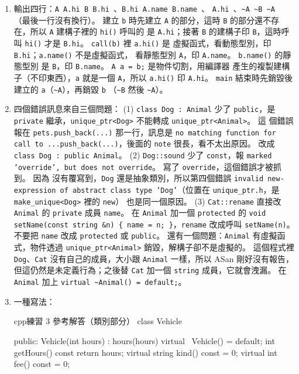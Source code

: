 \begin{enumerate}
\item 輸出四行：\texttt{A A.hi B B.hi }、\texttt{B.hi A.name B.name }、
\texttt{A.hi }、\texttt{\textasciitilde A \textasciitilde B \textasciitilde A }
（最後一行沒有換行）。 建立 \texttt{b} 時先建立 \texttt{A} 的部分，這時
\texttt{B} 的部分還不存在，所以 \texttt{A} 建構子裡的 \texttt{hi()} 呼叫的
是 \texttt{A.hi}；接著 \texttt{B} 的建構子印 \texttt{B}，這時呼叫
\texttt{hi()} 才是 \texttt{B.hi}。 \texttt{call(b)} 裡 \texttt{a.hi()} 是
虛擬函式，看動態型別，印 \texttt{B.hi}；\texttt{a.name()} 不是虛擬函式，
看靜態型別 \texttt{A}，印 \texttt{A.name}。 \texttt{b.name()} 的靜態型別
是 \texttt{B}，印 \texttt{B.name}。 \texttt{A a = b;} 是物件切割，用編譯器
產生的複製建構子（不印東西），\texttt{a} 就是一個 \texttt{A}，所以
\texttt{a.hi()} 印 \texttt{A.hi}。 \texttt{main} 結束時先銷毀後建立的
\texttt{a}（\texttt{\textasciitilde A}），再銷毀 \texttt{b}
（\texttt{\textasciitilde B} 然後 \texttt{\textasciitilde A}）。
\item 四個錯誤訊息來自三個問題：
(1) \texttt{class Dog : Animal} 少了 \texttt{public}，是 \texttt{private}
繼承，\texttt{unique\_ptr<Dog>} 不能轉成 \texttt{unique\_ptr<Animal>}。 這
個錯誤報在 \texttt{pets.push\_back(...)} 那一行，訊息是
\texttt{no matching function for call to ...push\_back(...)}，後面的
\texttt{note} 很長，看不太出原因。 改成 \texttt{class Dog : public Animal}。
(2) \texttt{Dog::sound} 少了 \texttt{const}，報 \texttt{marked 'override',
but does not override}。 寫了 \texttt{override}，這個錯誤才被抓到。 因為
沒有覆寫到，\texttt{Dog} 還是抽象類別，所以第四個錯誤
\texttt{invalid new-expression of abstract class type 'Dog'}（位置在
\texttt{unique\_ptr.h}，是 \texttt{make\_unique<Dog>} 裡的 \texttt{new}）
也是同一個原因。
(3) \texttt{Cat::rename} 直接改 \texttt{Animal} 的 \texttt{private} 成員
\texttt{name}。 在 \texttt{Animal} 加一個 \texttt{protected} 的
\texttt{void setName(const string \&n) \{ name = n; \}}，\texttt{rename}
改成呼叫 \texttt{setName(n)}。 不要把 \texttt{name} 改成
\texttt{protected} 或 \texttt{public}。
還有一個問題：\texttt{Animal} 有虛擬函式，物件透過
\texttt{unique\_ptr<Animal>} 銷毀，解構子卻不是虛擬的。 這個程式裡
\texttt{Dog}、\texttt{Cat} 沒有自己的成員，大小跟 \texttt{Animal} 一樣，所以
ASan 剛好沒有報告，但這仍然是未定義行為；之後替 \texttt{Cat} 加一個
\texttt{string} 成員，它就會洩漏。 在 \texttt{Animal} 加上
\texttt{virtual \textasciitilde Animal() = default;}。
\item 一種寫法：
\begin{code}{cpp}{練習 3 參考解答（類別部分）}
class Vehicle {
public:
    Vehicle(int hours) : hours(hours) {}
    virtual ~Vehicle() = default;
    int getHours() const { return hours; }
    virtual string kind() const = 0;
    virtual int fee() const = 0;

}
\end{code}
\end{enumerate}
